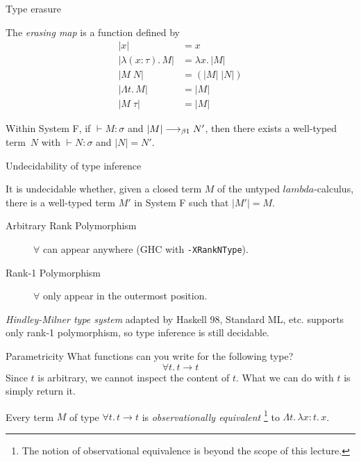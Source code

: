 \begin{frame}{Type erasure}
\begin{definition}
  The \emph{erasing map} is a function defined by
  \begin{align*}
    |x| & = x \\
    |\lambda (x : \tau).\,M| & = \lambda x.\, |M| \\
    |M\;N| & = (|M|\;|N|) \\
    |\Lambda t.\, M| & = |M| \\
    |M\;\tau| & = |M|
  \end{align*}
\end{definition}

\begin{proposition}
  Within System F, if ${}\vdash M : \sigma$ and $|M|
  \longrightarrow_{\beta1} N'$, then there exists a well-typed term~$N$ with
  ${}\vdash N : \sigma$ and $|N| = N'$.
\end{proposition}
\end{frame}

\begin{frame}{Undecidability of type inference}
  \begin{theorem}
     It is undecidable whether, given a closed term $M$ of the untyped
     $lambda$-calculus, there is a well-typed term $M'$ in System F such that
     $|M'| = M$.  
  \end{theorem}

  \begin{description}
    \item[Arbitrary Rank Polymorphism] $\forall$ can appear
      anywhere {\small (GHC with \texttt{-XRankNType})}. 
    \item[Rank-1 Polymorphism]
      $\forall$ only appear in the outermost position.
  \end{description}
  \emph{Hindley-Milner type system} adapted by Haskell 98, Standard ML, etc.
  supports only rank-1 polymorphism, so type inference is still decidable.
\end{frame}

\begin{frame}{Parametricity}
  What functions can you write for the following type?
  \[
    \forall t.\,t \to t 
  \]
  Since $t$ is arbitrary, we cannot inspect the content of $t$. What we can do
  with $t$ is simply return it.
  \begin{theorem}
    Every term $M$ of type $\forall t.\, t \to t$ is \emph{observationally equivalent}%
    \footnote{The notion of observational equivalence is beyond the scope of this lecture.}
      to $\Lambda t.\, \lambda x : t.\, x$. 
  \end{theorem}
\end{frame}

